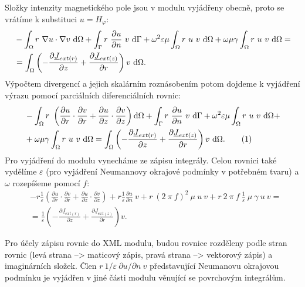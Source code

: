 \documentclass[12pt,a4paper,oneside]{article}
\numberwithin{equation}{section} %
\numberwithin{figure}{section} %
\numberwithin{table}{section} %
\newcommand{\faz}[1]{{\underline{#1}}} %
\newcommand\numberthis{\addtocounter{equation}{1}\tag{\theequation}}
\begin{document}
Složky intenzity magnetického pole jsou v modulu vyjádřeny obecně, proto se vrátíme k substituci $u = H _{\varphi}$:
\begin{equation}
\begin{split}
&- \int _{\Omega} r ~ \nabla u \cdot \nabla v ~ \ud \Omega + \int _{\Gamma} r ~ \frac{\partial u}{\partial n} ~ v ~ \ud \Gamma + \omega ^2 \varepsilon \mu \int _{\Omega} r ~ u ~ v ~ \ud \Omega + \omega \mu \gamma \int _{\Omega} r ~ u ~ v ~ \ud \Omega = 
\\
&= \int _{\Omega} \left( - \frac{\partial \faz{J} _{ext(r)}}{\partial z} + \frac{\partial \faz{J} _{ext(z)}}{\partial r} \right) v ~ \ud \Omega .
\end{split}
\end{equation}
Výpočtem divergencí a jejich skalárním roznásobením potom dojdeme k vyjádření výrazu pomocí parciálních diferenciálních rovnic:
\begin{align*}
&- \int _{\Omega} r ~ \left( \frac{\partial u}{\partial r} \cdot \frac{\partial v}{\partial r} + \frac{\partial u}{\partial z} \cdot \frac{\partial v}{\partial z} \right) \ud \Omega + \int _{\Gamma} r ~ \frac{\partial u}{\partial n} ~ v ~ \ud \Gamma + \omega ^2 \varepsilon \mu \int _{\Omega} r ~ u ~ v ~ \ud \Omega +\\
& + \omega \mu \gamma \int _{\Omega} r ~ u ~ v ~ \ud \Omega = \int _{\Omega}\left( - \frac{\partial \faz{J} _{ext(r)}}{\partial z} + \frac{\partial \faz{J} _{ext(z)}}{\partial r} \right) v ~ \ud \Omega .
\numberthis
\end{align*}
Pro vyjádření do modulu vynecháme ze zápisu integrály. Celou rovnici také vydělíme $\varepsilon$ (pro vyjádření Neumannovy okrajové podmínky v potřebném tvaru) a $\omega$ rozepíšeme pomocí $f$:
\begin{equation}
\label{HphiWeakEpsilon}
\begin{split}
&- r \frac{1}{\varepsilon} \left( \frac{\partial u}{\partial r} \cdot \frac{\partial v}{\partial r} + \frac{\partial u}{\partial z} \cdot \frac{\partial v}{\partial z} \right) + r \frac{1}{\varepsilon} \frac{\partial u}{\partial n} ~ v + r ~ (2 ~ \pi ~ f) ^2 ~ \mu ~ u ~ v + r ~ 2 ~ \pi ~ f ~ \frac{1}{\varepsilon} ~ \mu ~ \gamma ~ u ~ v =\\ 
&= \frac{1}{\varepsilon} \left( - \frac{\partial \faz{J} _{ext(r)}}{\partial z} + \frac{\partial \faz{J} _{ext(z)}}{\partial r} \right) v .
\end{split}
\end{equation}

Pro účely zápisu rovnic do XML modulu, budou rovnice rozděleny podle stran rovnic (levá strana --> maticový zápis, pravá strana --> vektorový zápis) a imaginárních složek. Člen $r ~ 1/ \varepsilon ~ \partial u / \partial n ~ v$ představující Neumanovu okrajovou podmínku je vyjádřen v jiné části modulu věnující se povrchovým integrálům.
\end{document}
